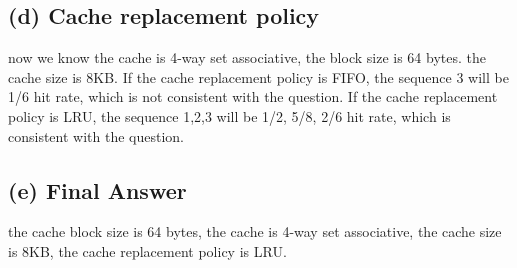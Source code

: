 \documentclass[cn,12pt]{homework}
\begin{document}
\begin{solution}
\subsection*{(d) Cache replacement policy}

now we know the cache is 4-way set associative, the block size is 64 bytes. the cache size is 8KB.
If the cache replacement policy is FIFO, the sequence 3 will be 1/6 hit rate, which is not consistent with the question.
If the cache replacement policy is LRU, the sequence 1,2,3 will be 1/2, 5/8, 2/6 hit rate, which is consistent with the question.

\subsection*{(e) Final Answer}

the cache block size is 64 bytes, the cache is 4-way set associative, the cache size is 8KB, the cache replacement policy is LRU.

\end{solution}
\end{document}
